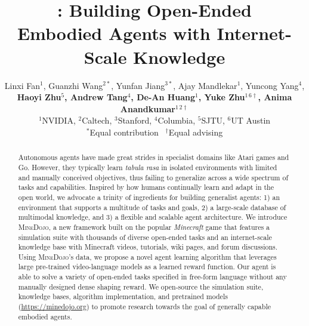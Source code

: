 \documentclass{article}
\title{\minedojo: Building Open-Ended \\ Embodied Agents with Internet-Scale Knowledge}
\author{%
    Linxi Fan$^1$, Guanzhi Wang$^{2*}$, Yunfan Jiang$^{3*}$, Ajay Mandlekar$^1$, Yuncong Yang$^4$,\\
    \textbf{Haoyi Zhu$^5$, Andrew Tang$^4$, De-An Huang$^1$, Yuke Zhu$^{1\,6 \dagger}$, Anima Anandkumar$^{1\,2 \dagger}$}\\
    $^1$NVIDIA, $^2$Caltech, $^3$Stanford, $^4$Columbia, $^5$SJTU, $^6$UT Austin\\
    $^*$Equal contribution \, $^\dagger$Equal advising \\
    \weburl
}
\newcommand{\minedojo}[0]{\mbox{\textsc{MineDojo}}\xspace}
\newcommand{\weburl}{\url{https://minedojo.org}}
\begin{document}
\maketitle

\begin{abstract}


Autonomous agents have made great strides in specialist domains like Atari games and Go. However, they typically learn \textit{tabula rasa} in isolated environments with limited and manually conceived objectives, thus failing to generalize across a wide spectrum of tasks and capabilities. 
Inspired by how humans continually learn and adapt in the open world, we advocate a trinity of ingredients for building generalist agents: 1) an environment that supports a multitude of tasks and goals, 2) a large-scale database of multimodal knowledge, and 3) a flexible and scalable agent architecture.  
We introduce \minedojo, a new framework built on the popular \textit{Minecraft} game that features a simulation suite with thousands of diverse open-ended tasks and an internet-scale knowledge base with Minecraft videos, tutorials, wiki pages, and forum discussions. Using \minedojo's data, we propose a novel agent learning algorithm that leverages large pre-trained video-language models as a learned reward function. Our agent is able to solve a variety of open-ended tasks specified in free-form language without any manually designed dense shaping reward. We open-source the simulation suite, knowledge bases, algorithm implementation, and pretrained models (\weburl) to promote research towards the goal of generally capable embodied agents.

\end{abstract}











\newpage
\appendix


\end{document}
